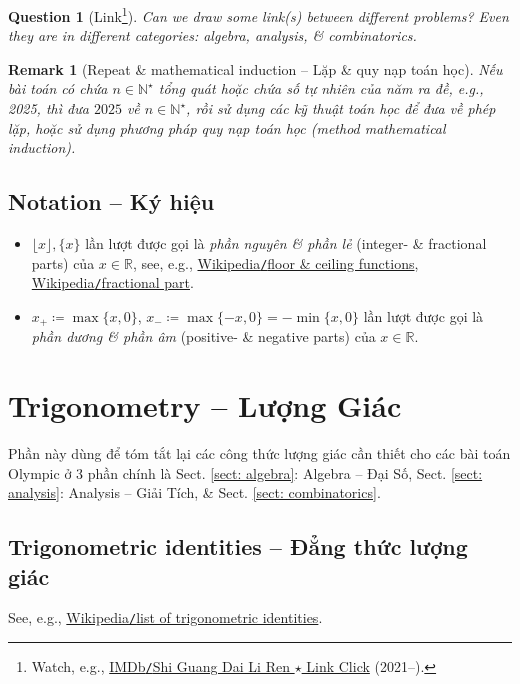 \documentclass{article}
\newtheorem{question}{Question}
\newtheorem{remark}{Remark}
\begin{document}
\begin{question}[Link\footnote{Watch, e.g., \href{https://www.imdb.com/title/tt14976292/}{IMDb{\tt/}Shi Guang Dai Li Ren $\star$ Link Click} (2021--).}]
	Can we draw some link(s) between different problems? Even they are in different categories: algebra, analysis, \& combinatorics.
\end{question}

\begin{remark}[Repeat \& mathematical induction -- Lặp \& quy nạp toán học]
	\label{rmk: repeat}
	Nếu bài toán có chứa $n\in\mathbb{N}^\star$ tổng quát hoặc chứa số tự nhiên của năm ra đề, e.g., 2025, thì đưa $2025$ về $n\in\mathbb{N}^\star$, rồi sử dụng các kỹ thuật toán học để đưa về phép lặp, hoặc sử dụng phương pháp quy nạp toán học (method mathematical induction).
\end{remark}

\subsection*{Notation -- Ký hiệu}

\begin{itemize}
	\item $\lfloor x\rfloor,\{x\}$ lần lượt được gọi là {\it phần nguyên \& phần lẻ} (integer- \& fractional parts) của $x\in\mathbb{R}$, see, e.g., \href{https://en.wikipedia.org/wiki/Floor_and_ceiling_functions}{Wikipedia{\tt/}floor \& ceiling functions}, \href{https://en.wikipedia.org/wiki/Fractional_part}{Wikipedia{\tt/}fractional part}.
	\item $x_+\coloneqq\max\{x,0\}$, $x_-\coloneqq\max\{-x,0\} = -\min\{x,0\}$ lần lượt được gọi là {\it phần dương \& phần âm} (positive- \& negative parts) của $x\in\mathbb{R}$.
\end{itemize}


\section{Trigonometry -- Lượng Giác}
Phần này dùng để tóm tắt lại các công thức lượng giác cần thiết cho các bài toán Olympic ở 3 phần chính là Sect. \ref{sect: algebra}: Algebra -- Đại Số, Sect. \ref{sect: analysis}: Analysis -- Giải Tích, \& Sect. \ref{sect: combinatorics}.

\subsection{Trigonometric identities -- Đẳng thức lượng giác}
See, e.g., \href{https://en.wikipedia.org/wiki/List_of_trigonometric_identities}{Wikipedia{\tt/}list of trigonometric identities}.
\end{document}
